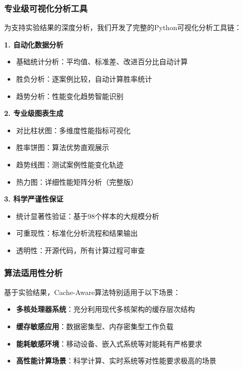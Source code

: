 \subsubsection{专业级可视化分析工具}

为支持实验结果的深度分析，我们开发了完整的Python可视化分析工具链：

\begin{tcolorbox}[
    colback=purple!5!white,
    colframe=purple!50!black,
    title=\textbf{可视化工具技术特色},
    fonttitle=\bfseries,
    arc=3pt
]
\textbf{1. 自动化数据分析}
\begin{itemize}
    \item 基础统计分析：平均值、标准差、改进百分比自动计算
    \item 胜负分析：逐案例比较，自动计算胜率统计
    \item 趋势分析：性能变化趋势智能识别
\end{itemize}

\textbf{2. 专业级图表生成}
\begin{itemize}
    \item 对比柱状图：多维度性能指标可视化
    \item 胜率饼图：算法优势直观展示
    \item 趋势线图：测试案例性能变化轨迹
    \item 热力图：详细性能矩阵分析（完整版）
\end{itemize}

\textbf{3. 科学严谨性保证}
\begin{itemize}
    \item 统计显著性验证：基于98个样本的大规模分析
    \item 可重现性：标准化分析流程和结果输出
    \item 透明性：开源代码，所有计算过程可审查
\end{itemize}
\end{tcolorbox}

\subsubsection{算法适用性分析}

基于实验结果，Cache-Aware算法特别适用于以下场景：

\begin{tcolorbox}[
    colback=cyan!5!white,
    colframe=cyan!50!black,
    title=\textbf{算法优势应用场景},
    fonttitle=\bfseries,
    arc=3pt
]
\begin{itemize}
    \item \textbf{多核处理器系统}：充分利用现代多核架构的缓存层次结构
    \item \textbf{缓存敏感应用}：数据密集型、内存密集型工作负载
    \item \textbf{能耗敏感环境}：移动设备、嵌入式系统等对能耗有严格要求
    \item \textbf{高性能计算场景}：科学计算、实时系统等对性能要求极高的场景
\end{itemize}
\end{tcolorbox}


